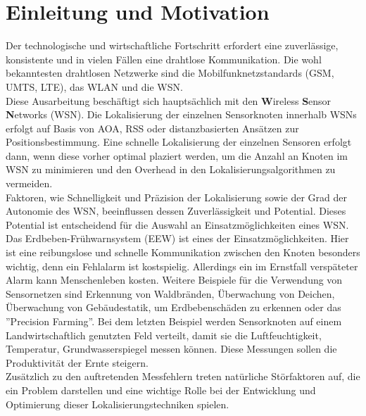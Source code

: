 \documentclass[12pt, a4wide]{scrreprt}
\begin{document}
\chapter{Einleitung und Motivation}
Der technologische und wirtschaftliche Fortschritt erfordert eine zuverlässige, konsistente und in vielen Fällen eine drahtlose Kommunikation. Die wohl bekanntesten drahtlosen Netzwerke sind die Mobilfunknetzstandards (GSM, UMTS, LTE), das WLAN und die WSN.\\
\indent 
Diese Ausarbeitung beschäftigt sich hauptsächlich mit den {\bf W}ireless {\bf S}ensor {\bf N}etworks (WSN). Die Lokalisierung der einzelnen Sensorknoten innerhalb WSNs erfolgt auf Basis von AOA, RSS oder distanzbasierten Ansätzen zur Positionsbestimmung. Eine schnelle Lokalisierung der einzelnen Sensoren erfolgt dann, wenn diese vorher optimal plaziert werden, um die Anzahl an Knoten im WSN zu minimieren und den Overhead in den Lokalisierungsalgorithmen zu vermeiden\cite{area_based}.\\
\indent
Faktoren, wie Schnelligkeit und Präzision der Lokalisierung sowie der Grad der Autonomie des WSN, beeinflussen dessen Zuverlässigkeit und Potential. Dieses Potential ist entscheidend für die Auswahl an Einsatzmöglichkeiten eines WSN. Das Erdbeben-Frühwarnsystem (EEW) ist eines der Einsatzmöglichkeiten. Hier ist eine reibungslose und schnelle Kommunikation zwischen den Knoten besonders wichtig, denn ein Fehlalarm ist kostspielig. Allerdings ein im Ernstfall verspäteter Alarm kann Menschenleben kosten. Weitere Beispiele für die Verwendung von Sensornetzen sind Erkennung von Waldbränden, Überwachung von Deichen, Überwachung von Gebäudestatik, um Erdbebenschäden zu erkennen\cite{building_monitoring} oder das ''Precision Farming''. Bei dem letzten Beispiel werden Sensorknoten auf einem Landwirtschaftlich genutzten Feld verteilt, damit sie die Luftfeuchtigkeit, Temperatur, Grundwasserspiegel messen können. Diese Messungen sollen die Produktivität der Ernte steigern.\\
\indent
Zusätzlich zu den auftretenden Messfehlern treten natürliche Störfaktoren auf, die ein Problem darstellen und eine wichtige Rolle bei der Entwicklung und Optimierung dieser Lokalisierungstechniken spielen.
\end{document}
